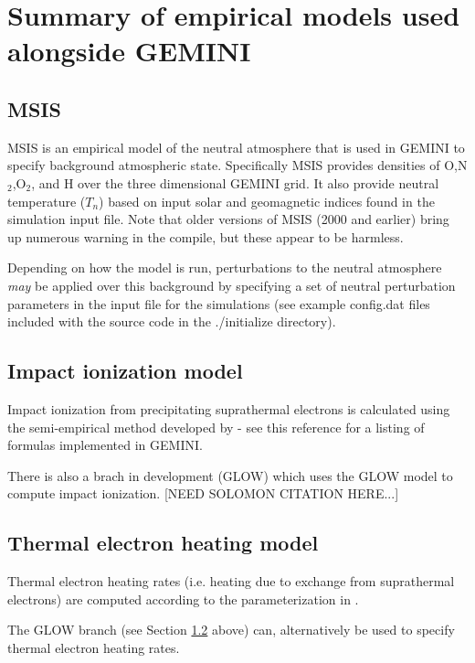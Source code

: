 \documentclass[11pt,letterpaper]{article}
\begin{document}
\section{Summary of empirical models used alongside GEMINI}

\subsection{MSIS}

MSIS is an empirical model of the neutral atmosphere \citep{Picone:2002} that is used in GEMINI to specify background atmospheric state.  Specifically MSIS provides densities of O,N$_2$,O$_2$, and H over the three dimensional GEMINI grid.  It also provide neutral temperature ($T_n$) based on input solar and geomagnetic indices found in the simulation input file.  Note that older versions of MSIS (2000 and earlier) bring up numerous warning in the compile, but these appear to be harmless.  

Depending on how the model is run, perturbations to the neutral atmosphere \emph{may} be applied over this background by specifying a set of neutral perturbation parameters in the input file for the simulations (see example config.dat files included with the source code in the ./initialize directory).  


\subsection{Impact ionization model} \label{sec:impact}

Impact ionization from precipitating suprathermal electrons is calculated using the semi-empirical method developed by \citet{Fang:2008} - see this reference for a listing of formulas implemented in GEMINI.

There is also a brach in development (GLOW) which uses the GLOW model to compute impact ionization.  [NEED SOLOMON CITATION HERE...]


\subsection{Thermal electron heating model}

Thermal electron heating rates (i.e. heating due to exchange from suprathermal electrons) are computed according to the parameterization in \citet{Swartz:1972}.

The GLOW branch (see Section \ref{sec:impact} above) can, alternatively be used to specify thermal electron heating rates.  
\end{document}
